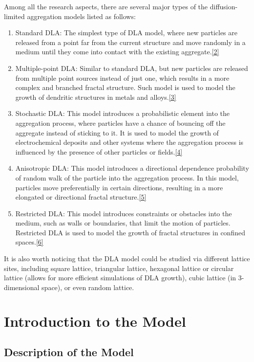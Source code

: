\documentclass[10pt]{article}
\begin{document}
Among all the research aspects, there are several major types of the diffusion-limited aggregation models listed as follows:
\begin{enumerate}[itemsep=0pt]
	\item Standard DLA: The simplest type of DLA model, where new particles are released from a point far from the current structure and move randomly in a medium until they come into contact with the existing aggregate.\hyperref[ref2]{[2]}
	\item Multiple-point DLA: Similar to standard DLA, but new particles are released from multiple point sources instead of just one, which results in a more complex and branched fractal structure. Such model is used to model the growth of dendritic structures in metals and alloys.\hyperref[ref3]{[3]}
	\item Stochastic DLA: This model introduces a probabilistic element into the aggregation process, where particles have a chance of bouncing off the aggregate instead of sticking to it. It is used to model the growth of electrochemical deposits and other systems where the aggregation process is influenced by the presence of other particles or fields.\hyperref[ref4]{[4]}
	\item Anisotropic DLA: This model introduces a directional dependence probability of random walk of the particle into the aggregation process. In this model, particles move preferentially in certain directions, resulting in a more elongated or directional fractal structure.\hyperref[ref5]{[5]}
	\item Restricted DLA: This model introduces constraints or obstacles into the medium, such as walls or boundaries, that limit the motion of particles. Restricted DLA is used to model the growth of fractal structures in confined spaces.\hyperref[ref6]{[6]}
\end{enumerate}

It is also worth noticing that the DLA model could be studied via different lattice sites, including square lattice, triangular lattice, hexagonal lattice or circular lattice (allows for more efficient simulations of DLA growth), cubic lattice (in 3-dimensional space), or even random lattice.

\section{Introduction to the Model}

\subsection{Description of the Model}
\end{document}

